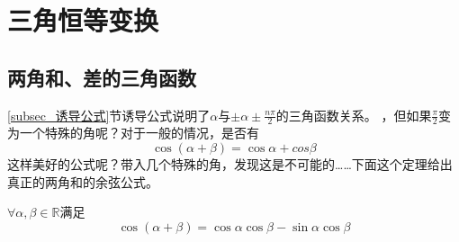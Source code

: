 \section{三角恒等变换}
\subsection{两角和、差的三角函数}
    \ref{subsec_诱导公式}节诱导公式说明了$\alpha$与$\pm \alpha \pm \frac{n\pi}{2}$的三角函数关系。
    ，但如果\(\frac{\pi}{2}\)变为一个特殊的角呢？对于一般的情况，是否有
    \[\cos(\alpha+\beta) = \cos \alpha+cos \beta\]
    这样美好的公式呢？带入几个特殊的角，发现这是不可能的……下面这个定理给出真正的两角和的余弦公式。
\begin{theorem}[两角和的余弦]\label{两角和余弦定理}
    $\forall \alpha,\beta \in \mathbb{R} $满足
    \begin{equation}
        \cos(\alpha+\beta) = \cos \alpha\cos \beta -\sin \alpha\cos \beta  
    \end{equation}
\end{theorem}
